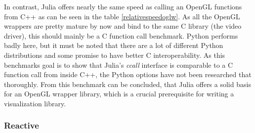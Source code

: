 In contrast, Julia offers nearly the same speed as calling an OpenGL functions from C++ as can be seen in the table \cref{relativespeedoglw}.
As all the OpenGL wrappers are pretty mature by now and bind to the same C library (the video driver), this should mainly be a C function call benchmark.
Python performs badly here, but it must be noted that there are a lot of different Python distributions and some promise to have better C interoperability.
As this benchmarks goal is to show that Julia’s \textit{ccall} interface is comparable to a C function call from inside C++, the Python options have not been researched that thoroughly.
From this benchmark can be concluded, that Julia offers a solid basis for an OpenGL wrapper library, which is a crucial prerequisite for writing a visualization library.

\subsubsection{Reactive}

